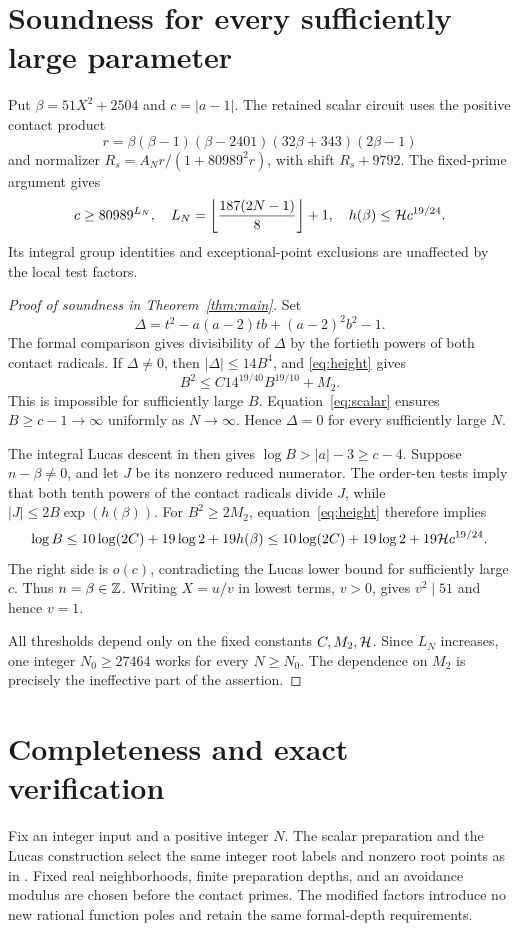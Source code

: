 \documentclass[11pt,a4paper]{article}
\theoremstyle{remark}\newtheorem{remark}[theorem]{Remark}
\begin{document}
\section{Soundness for every sufficiently large parameter}
Put $\beta=51X^2+2504$ and $c=|a-1|$. The retained scalar circuit
uses the positive contact product
\[
 r=\beta(\beta-1)(\beta-2401)(32\beta+343)(2\beta-1)
\]
and normalizer $R_s=A_Nr/(1+80989^2r)$, with shift $R_s+9792$.
The fixed-prime argument gives
\begin{equation}\label{eq:scalar}
 c\ge80989^{L_N},\quad
 L_N=\left\lfloor\frac{187(2N-1)}8\right\rfloor+1,\quad
 h(\beta)\le\mathcal H c^{19/24}.
\end{equation}
Its integral group identities and exceptional-point exclusions are
unaffected by the local test factors.

\begin{proof}[Proof of soundness in Theorem~\ref{thm:main}]
Set
\[
 \Delta=t^2-a(a-2)tb+(a-2)^2b^2-1.
\]
The formal comparison gives divisibility of $\Delta$ by the fortieth
powers of both contact radicals. If $\Delta\ne0$, then
$|\Delta|\le14B^4$, and \eqref{eq:height} gives
\[
                     B^2\le C14^{19/40}B^{19/10}+M_2.
\]
This is impossible for sufficiently large $B$. Equation~\eqref{eq:scalar}
ensures $B\ge c-1\to\infty$ uniformly as $N\to\infty$. Hence
$\Delta=0$ for every sufficiently large $N$.

The integral Lucas descent in \cite{Source} then gives
$\log B>|a|-3\ge c-4$. Suppose $n-\beta\ne0$, and let $J$ be
its nonzero reduced numerator. The order-ten tests imply that both
tenth powers of the contact radicals divide $J$, while
$|J|\le2B\exp(h(\beta))$. For $B^2\ge2M_2$, equation~\eqref{eq:height}
therefore implies
\[
 \log B\le10\log(2C)+19\log2+19h(\beta)
          \le10\log(2C)+19\log2+19\mathcal H c^{19/24}.
\]
The right side is $o(c)$, contradicting the Lucas lower bound for
sufficiently large $c$. Thus $n=\beta\in\mathbb Z$. Writing $X=u/v$ in
lowest terms, $v>0$, gives $v^2\mid51$ and hence $v=1$.

All thresholds depend only on the fixed constants $C,M_2,\mathcal H$.
Since $L_N$ increases, one integer $N_0\ge27464$ works for every
$N\ge N_0$. The dependence on $M_2$ is precisely the ineffective
part of the assertion.
\end{proof}

\section{Completeness and exact verification}
Fix an integer input and a positive integer $N$. The scalar preparation
and the Lucas construction select the same integer root labels and
nonzero root points as in \cite{Baseline}. Fixed real neighborhoods,
finite preparation depths, and an avoidance modulus are chosen before
the contact primes. The modified factors introduce no new rational
function poles and retain the same formal-depth requirements.
\end{document}
